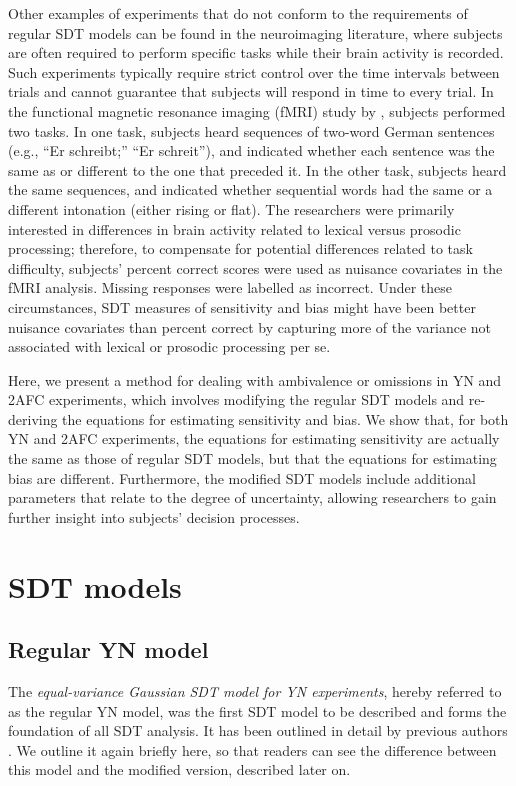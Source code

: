\documentclass[man]{apa6}
\begin{document}
Other examples of experiments that do not conform to the requirements of regular SDT models can be found in the neuroimaging literature, where subjects are often required to perform specific tasks while their brain activity is recorded. Such experiments typically require strict control over the time intervals between trials and cannot guarantee that subjects will respond in time to every trial. In the functional magnetic resonance imaging (fMRI) study by \textcite{kreitewolfhemispheric2014}, subjects performed two tasks. In one task, subjects heard sequences of two-word German sentences (e.g., ``Er schreibt;'' ``Er schreit''), and indicated whether each sentence was the same as or different to the one that preceded it. In the other task, subjects heard the same sequences, and indicated whether sequential words had the same or a different intonation (either rising or flat). The researchers were primarily interested in differences in brain activity related to lexical versus prosodic processing; therefore, to compensate for potential differences related to task difficulty, subjects' percent correct scores were used as nuisance covariates in the fMRI analysis. Missing responses were labelled as incorrect. Under these circumstances, SDT measures of sensitivity and bias might have been better nuisance covariates than percent correct by capturing more of the variance not associated with lexical or prosodic processing per se.

Here, we present a method for dealing with ambivalence or omissions in YN and 2AFC experiments, which involves modifying the regular SDT models and re-deriving the equations for estimating sensitivity and bias. We show that, for both YN and 2AFC experiments, the equations for estimating sensitivity are actually the same as those of regular SDT models, but that the equations for estimating bias are different. Furthermore, the modified SDT models include additional parameters that relate to the degree of uncertainty, allowing researchers to gain further insight into subjects' decision processes.

\section{SDT models}
\subsection{Regular YN model}
The \emph{equal-variance Gaussian SDT model for YN experiments}, hereby referred to as the regular YN model, was the first SDT model to be described \parencite{Peterson1954, Tanner1954} and forms the foundation of all SDT analysis. It has been outlined in detail by previous authors \parencite[e.g.,][]{Green1966, Macmillan2005}. We outline it again briefly here, so that readers can see the difference between this model and the modified version, described later on.
\end{document}
